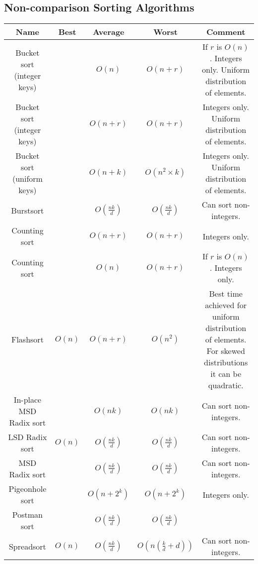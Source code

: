 \documentclass{article}
\begin{document}

\newpage
\subsection*{Non-comparison Sorting Algorithms}

\begin{table}[ht]
	\centering
	\scriptsize
	\begin{tabular}{ccccc}
		\textbf{Name} & \textbf{Best}& \textbf{Average} & \textbf{Worst} & \textbf{Comment}\\
		\hline
		Bucket sort (integer keys)\footnotemark[12] &  & $O(n)$ & $O(n + r)$ & \makecell{If $r$ is $O(n)$.\\Integers only.\\Uniform distribution of elements.}\\
		Bucket sort (integer keys)\footnotemark[12] &  & $O(n+r)$ & $O(n + r)$ & \makecell{Integers only.\\Uniform distribution of elements.}\\
		Bucket sort (uniform keys)\footnotemark[13] &  & $O(n+k)$ & $O(n^2 \times k)$ & \makecell{Integers only.\\Uniform distribution of elements.}\\
		Burstsort\footnotemark[13] \footnotemark[14] &  & $O(\frac{nk}{d})$ & $O(\frac{nk}{d})$ & Can sort non-integers.\\
		Counting sort\footnotemark[12] & & $O(n+r)$ & $O(n+r)$ & Integers only.\\
		Counting sort\footnotemark[12] & & $O(n)$ & $O(n+r)$ & \makecell{If $r$ is $O(n)$.\\Integers only.}\\
		Flashsort\footnotemark[12] &$O(n)$ & $O(n+r)$ & $O(n^2)$ & \makecell{Best time achieved for uniform distribution of elements.\\For skewed distributions it can be quadratic.}\\
		In-place MSD Radix sort\footnotemark[13] \footnotemark[14] &  & $O(nk)$ & $O(nk)$ & Can sort non-integers.\\
		LSD Radix sort\footnotemark[13] \footnotemark[14] & $O(n)$ & $O(\frac{nk}{d})$ & $O(\frac{nk}{d})$ & Can sort non-integers.\\
		MSD Radix sort\footnotemark[13] \footnotemark[14] &  & $O(\frac{nk}{d})$ & $O(\frac{nk}{d})$ & Can sort non-integers.\\
		Pigeonhole sort\footnotemark[13] &  & $O(n+2^k)$ & $O(n+2^k)$ & Integers only.\\
		Postman sort\footnotemark[13] \footnotemark[14] &  & $O(\frac{nk}{d})$ & $O(\frac{nk}{d})$ & \\
		Spreadsort\footnotemark[13] \footnotemark[14] & $O(n)$  & $O(\frac{nk}{d})$ & $O(n(\frac{k}{d} + d))$ & Can sort non-integers.\\
		\hline
	\end{tabular}
\end{table}
\end{document}
